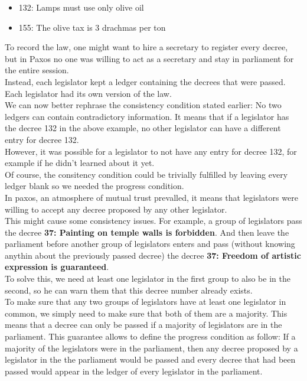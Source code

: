 \documentclass{article}
\begin{document}
\begin{itemize}
    \item 132: Lamps must use only olive oil
    \item 155: The olive tax is 3 drachmas per ton
\end{itemize}

To record the law, one might want to hire a secretary to register every decree, but in Paxos no one was willing to act as a secretary and stay in parliament for the entire session.\\
Instead, each legislator kept a ledger containing the decrees that were passed. Each legislator had its own version of the law.\\

We can now better rephrase the consistency condition stated earlier: No two ledgers can contain contradictory information. It means that if a legislator has the decree 132 in the above example, no other legislator can have a different entry for decree 132.\\
However, it was possible for a legislator to not have any entry for decree 132, for example if he didn't learned about it yet.\\
Of course, the consitency condition could be trivially fulfilled by leaving every ledger blank so we needed the progress condition.\\
In paxos, an atmosphere of mutual trust prevalled, it means that legislators were willing to accept any decree proposed by any other legislator.\\
This might cause some consistency issues. For example, a group of legislators pass the decree \textbf{37: Painting on temple walls is forbidden}. And then leave the parliament before another group of legislators enters and pass (without knowing anythin about the previously passed decree) the decree \textbf{37: Freedom of artistic expression is guaranteed}.\\
To solve this, we need at least one legislator in the first group to also be in the second, so he can warn them that this decree number already exists.\\
To make sure that any two groups of legislators have at least one legislator in common, we simply need to make sure that both of them are a majority. This means that a decree can only be passed if a majority of legislators are in the parliament.
This guarantee allows to define the progress condition as follow:
If a majority of the legislators were in the parliament, then any decree proposed by a legislator in the the parliament would be passed and every decree that had been passed would appear in the ledger of every legislator in the parliament.\\
\end{document}
